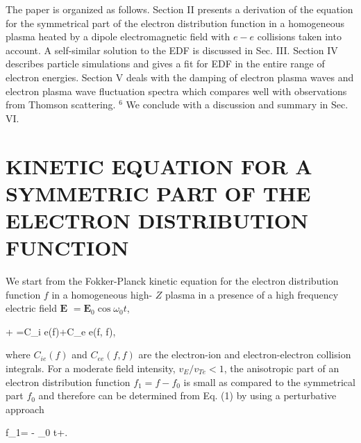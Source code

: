 \documentclass[oneside,onecolumn]{article}
\begin{document}
\begin{sloppypar}
 The paper is organized as follows. Section II presents a derivation of the equation for the symmetrical part of the electron distribution function in a homogeneous plasma heated by a dipole electromagnetic field with $e-e$ collisions taken into account. A self-similar solution to the EDF is discussed in Sec. III. Section IV describes particle simulations and gives a fit for EDF in the entire range of electron energies. Section $\mathrm{V}$ deals with the damping of electron plasma waves and electron plasma wave fluctuation spectra which compares well with observations from Thomson scattering. ${ }^{6}$ We conclude with a discussion and summary in Sec. VI.
 
 \section{KINETIC EQUATION FOR A SYMMETRIC PART OF THE ELECTRON DISTRIBUTION FUNCTION}
 We start from the Fokker-Planck kinetic equation for the electron distribution function $f$ in a homogeneous high- $Z$ plasma in a presence of a high frequency electric field $\mathbf{E}$ $=\mathbf{E}_{0} \cos \omega_{0} t$,
 
 + \cdot {}=C_{i e}(f)+C_{e e}(f, f),
 
 where $C_{i e}(f)$ and $C_{e e}(f, f)$ are the electron-ion and electron-electron collision integrals. For a moderate field intensity, $v_{E} / v_{T e}<1$, the anisotropic part of an electron distribution function $f_{1}=f-f_{0}$ is small as compared to the symmetrical part $f_{0}$ and therefore can be determined from Eq. (1) by using a perturbative approach
 
 f_{1}=  -  \sin \omega_{0} t+ .
 

\end{sloppypar}
\end{document}

